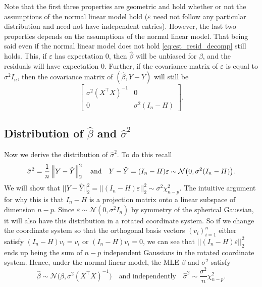 Note that the first three properties are geometric and hold whether or not the assumptions of the normal linear model hold ($\varepsilon$ need not follow any particular distribution and need not have independent entries). However, the last two properties depends on the assumptions of the normal linear model. That being said even if the normal linear model does not hold \eqref{eq:est_resid_decomp} still holds. This, if $\varepsilon$ has expectation $0$, then $\hat{\beta}$ will be unbiased for $\beta$, and the residuals will have expectation $0$. Further, if the covariance matrix of $\varepsilon$ is equal to $\sigma^2 I_n$, then the covariance matrix of $(\hat{\beta},Y- \hat{Y} )$ will still be 
\[
	\begin{bmatrix} \sigma^2 (X^\top X)^{-1} & 0 \\ 0 & \sigma^2 (I_n - H) \end{bmatrix}.
\]


\subsection{Distribution of $\hat{\beta}$ and $\hat{\sigma}^2$}


Now we derive the distribution of $\hat{\sigma}^2$. To do this recall 
\[
	\hat{\sigma}^2 =  \frac{1}{n} \left \lVert Y-\hat{Y} \right \rVert_2^2 \quad \text{and} \quad Y - \hat{Y}= (I_n - H) \varepsilon  \sim \mathcal{N} \big(0,\sigma^2 (I_n -H) \big).
\]
We will show that $\vert \vert Y - \hat{Y} \vert \vert_2^2 = \vert \vert (I_n - H) \varepsilon \vert \vert_2^2 \sim \sigma^2 \chi_{n-p}^2$. The intuitive argument for why this is that $I_n - H$ is a projection matrix onto a linear subspace of dimension $n-p$. Since $\varepsilon \sim \mathcal{N} (0,\sigma^2 I_n)$ by symmetry of the spherical Gaussian, it will also have this distribution in a rotated coordinate system. So if we change the coordinate system so that the orthogonal basis vectors $(v_i)_{i=1}^n$ either satisfy $(I_n - H) v_i=v_i$ or $(I_n -H) v_i =0$, we can see that $\vert \vert (I_n - H) \varepsilon \vert \vert_2^2$ ends up being the sum of $n-p$ independent Gaussians in the rotated coordinate system.
 Hence, under the normal linear model, the MLE $\beta$ and $\sigma^2$ satisfy
\begin{equation}\label{eq:MLE_dist}
\hat{\beta} \sim \mathcal{N} \big(\beta, \sigma^2 (X^\top  X)^{-1} \big) \quad \text{and independently} \quad \hat{\sigma}^2 \sim \frac{\sigma^2}{n} \chi_{n-p}^2.
\end{equation}




